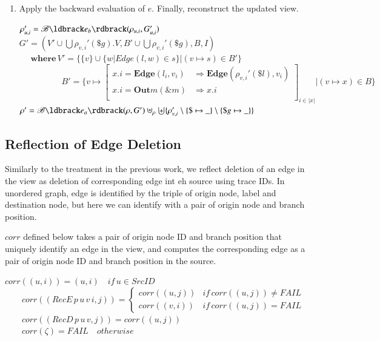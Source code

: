 \documentclass{llncs}
\begin{document}
\begin{enumerate}
\item Apply the backward evaluation of $e$. Finally, reconstruct the updated view.

$\rho_{u,i}'=\mathscr{B}\ldbrack e_b\rdbrack(\rho_{u,i},G_{u,i}')$\\
$G'=(V'\cup\bigcup\rho_{v,i}'(\$g).V,B'\cup\bigcup\rho_{v,i}'(\$g),B,I)$\\
$\mbox{~~~~}\mathbf{where}\,V'=\{\{v\}\cup\{w|Edge(l,w)\in s\}|(v\mapsto s)\in B'\}$\\
$\mbox{~~~~~~~~~~~~~~~}B'=\{v\mapsto \left[
    \begin{array}{ll}
    x.i=\mathbf{Edge}(l_i,v_i)& \Rightarrow \mathbf{Edge}(\rho_{v,i}'(\$l),v_i)\\
    x.i=\mathbf{Out}m(\&m) & \Rightarrow x.i\\
    \end{array}\right]_{i\in |x|}|(v\mapsto x)\in B\}$\\
$\rho'=\mathscr{B}\ldbrack e_a\rdbrack(\rho,G')\uplus_{\rho}\biguplus\{\rho_{v,i}'\setminus\{\$\mapsto\_\}\setminus\{\$g\mapsto\_\}\}$

\end{enumerate}

\subsection{Reflection of Edge Deletion}\label{subsec:bak-del}

Similarly to the treatment in the previous work, we reflect deletion of an edge in the view as deletion of corresponding edge int eh source using trace IDs. In unordered graph, edge is identified by the triple of origin node, label and destination node, but here we can identify with a pair of origin node and branch position.

$corr$ defined below takes a pair of origin node ID and branch position that uniquely identify an edge in the view, and computes the corresponding edge as a pair of origin node ID and branch position in the source.

$corr((u,i))=(u,i)\quad if\, u\in SrcID$\\
$\mbox{~~~~~~}corr((RecE\,p\,u\,v\,i,j))=\left\{
		\begin{array}{ll} 
			corr((u,j)) & if\,corr((u,j))\neq FAIL\\
			corr((v,i)) & if\,corr((u,j))= FAIL
		\end{array}\right.$\\
$\mbox{~~~~~~}corr((RecD\,p\,u\,v,j))=corr((u,j))$\\
$\mbox{~~~~~~}corr(\zeta)=FAIL\quad otherwise$
\end{document}
